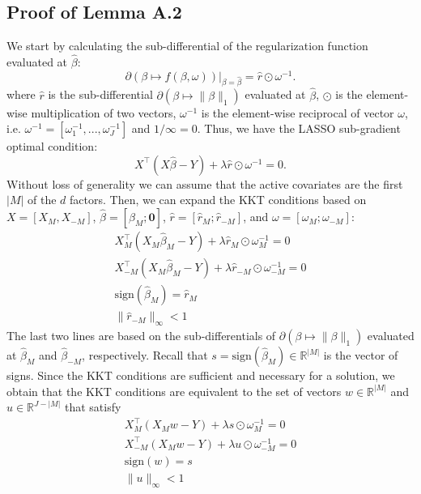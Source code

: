 \documentclass[11pt]{article}
\newcommand{\pa}{\partial}
\newcommand{\sgn}{\textrm{sign}}
\newcommand{\RR}{\mathbb{R}}
\begin{document}
	\subsection{Proof of Lemma A.2}
	We start by calculating the sub-differential of the regularization function evaluated at $\hat{\beta}$:
	\begin{equation}
		\partial(\beta\mapsto f(\beta,\omega))|_{\beta=\hat{\beta}}
		=\hat{r}\odot\omega^{-1}.
	\end{equation}
	where $\hat{r}$ is the sub-differential $\pa(\beta\mapsto\|\beta\|_1)$ evaluated at $\hat{\beta}$, $\odot$ is the element-wise multiplication of two vectors, $\omega^{-1}$ is the element-wise reciprocal of vector $\omega$, i.e. $\omega^{-1}=[\omega_1^{-1},...,\omega_J^{-1}]$ and $1/\infty=0$. Thus, we have the LASSO sub-gradient optimal condition:
	\begin{equation}
		X^\top(X\hat{\beta}-Y)+\lambda \hat{r}\odot\omega^{-1}=0.
	\end{equation}
	Without loss of generality we can assume that the active covariates are the first $|M|$ of the $d$ factors. Then, we can expand the KKT conditions based on $X=[X_M,X_{-M}]$, $\hat{\beta}=[\hat{\beta}_M;\bm{0}]$, $\hat{r}=[\hat{r}_M;\hat{r}_{-M}]$, and $\omega=[\omega_M;\omega_{-M}]$:
	\begin{equation}
		\begin{split}
			X_M^\top(X_M\hat{\beta}_M-Y)+\lambda\hat{r}_{M}\odot\omega_M^{-1}=0\\
			X_{-M}^\top(X_M\hat{\beta}_M-Y)+\lambda\hat{r}_{-M}\odot\omega_{-M}^{-1}=0\\
			\sgn(\hat{\beta}_M)=\hat{r}_M\\
			\|\hat{r}_{-M}\|_\infty<1
		\end{split}
	\end{equation}
	The last two lines are based on the sub-differentials of $\pa(\beta\mapsto\|\beta\|_1)$ evaluated at $\hat{\beta}_M$ and $\hat{\beta}_{-M}$, respectively. Recall that $s=\sgn(\hat{\beta}_M)\in\RR^{|M|}$ is the vector of signs. Since the KKT conditions are sufficient and necessary for a solution, we obtain that the KKT conditions are equivalent to the set of vectors $w\in\RR^{|M|}$ and $u\in\RR^{J-|M|}$ that satisfy 
	\begin{equation}\label{18}
		\begin{split}
			X_M^\top(X_Mw-Y)+\lambda s\odot\omega_M^{-1}=0\\
			X_{-M}^\top(X_Mw-Y)+\lambda u\odot\omega_{-M}^{-1}=0\\
			\sgn(w)=s\\
			\|u\|_\infty<1
		\end{split}
	\end{equation}
\end{document}
